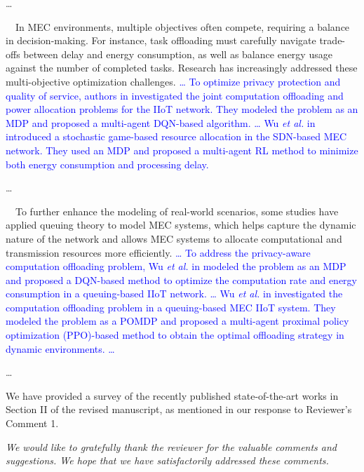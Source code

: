 \documentclass[12pt,draftclsnofoot,onecolumn]{IEEEtran}
\newcommand{\rev}[1]{{\color{blue}#1}} %
\newcommand{\rev}[1]{#1}
\newenvironment{my}[2]%
{\begin{list}{}%
{\setlength{\rightmargin}{#1}\setlength{\leftmargin}{#2}}%


 \item[]{}

} {\end{list}}
\begin{document}
\begin{enumerate}
	\begin{my}{1cm}{1cm}
		\rev{
			{
				\color{black}
				
				
				
				\dots
				
				\,\,\,\,
				In MEC environments, multiple objectives often compete, requiring a balance in decision-making. For instance, task offloading must carefully navigate trade-offs between delay and energy consumption, as well as balance energy usage against the number of completed tasks. Research has increasingly addressed these multi-objective optimization challenges.
				 \textcolor{blue}{\dots
				To optimize privacy protection and quality of service, authors in \cite{wu2024privacy} investigated the joint computation offloading and power allocation problems for the IIoT network. They modeled the problem as an MDP and proposed a multi-agent DQN-based algorithm. 
				\dots
				Wu \textit{et al.} in \cite{wu2023computation} introduced a stochastic game-based resource allocation in the SDN-based MEC network. They used an MDP and proposed a multi-agent RL method to minimize both energy consumption and processing delay. }
				
				\dots
				
				\,\,\,\,
				To further enhance the modeling of real-world scenarios, some studies have applied queuing theory to model MEC systems, which helps capture the dynamic nature of the network and allows MEC systems to allocate computational and transmission resources more efficiently.
				\textcolor{blue}{\dots
				To address the privacy-aware computation offloading problem, Wu \textit{et al.} in \cite{wu2024combining} modeled the problem as an MDP and proposed a DQN-based method to optimize the computation rate and energy consumption in a queuing-based IIoT network. \dots
				Wu \textit{et al.} in \cite{wu2023multi} investigated the computation offloading problem in a queuing-based MEC IIoT system. They modeled the problem as a POMDP and proposed a multi-agent proximal policy optimization (PPO)-based method to obtain the optimal offloading strategy in dynamic environments.
				\dots}

				
				\dots
				
				
		}}
	\end{my}\vspace{6mm}

We have provided a survey of the recently published state-of-the-art works in Section II of the revised manuscript, as mentioned in our response to Reviewer's Comment 1.\newline


	
\end{enumerate}

\vspace{10mm}

\textit{We would like to gratefully thank the reviewer for the valuable comments and suggestions. We hope that we have satisfactorily addressed these comments.}\newline
\end{document}

